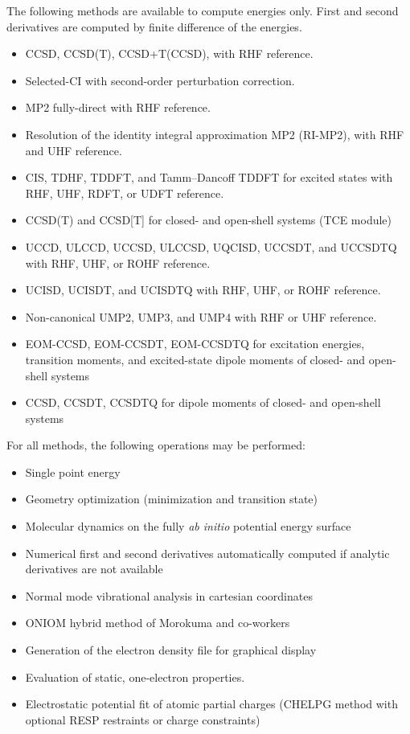 The following methods are available to compute energies only.  First
and second derivatives are computed by finite difference of the
energies.
\begin{itemize}
\item CCSD, CCSD(T), CCSD+T(CCSD), with RHF reference.
\item Selected-CI with second-order perturbation correction.
\item MP2 fully-direct with RHF reference.
\item Resolution of the identity integral approximation MP2 (RI-MP2), with
  RHF and UHF reference.
\item CIS, TDHF, TDDFT, and Tamm--Dancoff TDDFT for excited states with RHF, UHF, RDFT, or UDFT reference.
\item CCSD(T) and CCSD[T] for closed- and open-shell systems (TCE module)
\item UCCD, ULCCD, UCCSD, ULCCSD, UQCISD, UCCSDT, and UCCSDTQ with RHF, UHF, or ROHF reference.
\item UCISD, UCISDT, and UCISDTQ with RHF, UHF, or ROHF reference.
\item Non-canonical UMP2, UMP3, and UMP4 with RHF or UHF reference.
\item EOM-CCSD, EOM-CCSDT, EOM-CCSDTQ for excitation energies, transition
moments, and excited-state dipole moments of closed- and open-shell
systems
\item CCSD, CCSDT, CCSDTQ for dipole moments of closed- and open-shell
systems
\end{itemize}

For all methods, the following operations may be performed:
\begin{itemize}
\item Single point energy
\item Geometry optimization (minimization and transition state)
\item Molecular dynamics on the fully {\em ab initio} potential energy
  surface
\item Numerical first and second derivatives automatically computed if
  analytic derivatives are not available
\item Normal mode vibrational analysis in cartesian coordinates
\item ONIOM hybrid method of Morokuma and co-workers
\item Generation of the electron density file for graphical display
\item Evaluation of static, one-electron properties.
\item Electrostatic potential fit of atomic partial charges (CHELPG method with
    optional RESP restraints or charge constraints)
\end{itemize}


